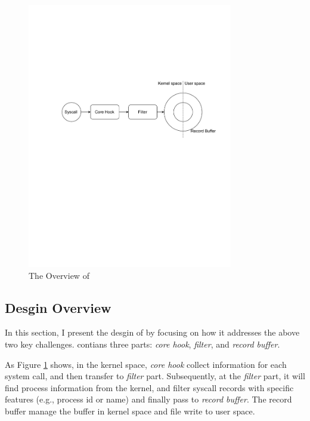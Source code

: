 \begin{figure}
    \centering
    \includegraphics[width=0.8\textwidth]{figures/arch.pdf}
    \caption{The Overview of \TheName}
    \label{fig:arch}
\end{figure}




\subsection{Desgin Overview}

In this section, I present the desgin of \TheName by focusing on how it addresses the above two key challenges. \TheName contians three parts: \textit{core hook}, \textit{filter}, and \textit{record buffer}. 

As Figure \ref{fig:arch} shows, in the kernel space, \textit{core hook} collect information for each system call, and then transfer to \textit{filter} part. Subsequently, at the \textit{filter} part, it will find process information from the kernel, and filter syscall records with specific features (e.g., process id or name) and finally pass to \textit{record buffer}. The record buffer manage the buffer in kernel space and file write to user space.


